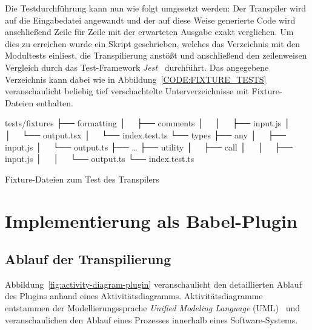 Die Testdurchführung kann nun wie folgt umgesetzt werden: Der Transpiler wird auf die Eingabedatei angewandt und der auf diese Weise generierte Code wird anschließend Zeile für Zeile mit der erwarteten Ausgabe exakt verglichen. Um dies zu erreichen wurde ein Skript geschrieben, welches das Verzeichnis mit den Modultests einliest, die Transpilierung anstößt und anschließend den zeilenweisen Vergleich durch das Test-Framework \textit{Jest}~\autocite{SOFTWARE:JEST} durchführt. Das angegebene Verzeichnis kann dabei wie in Abbildung~\ref{CODE:FIXTURE_TESTS} veranschaulicht beliebig tief verschachtelte Unterverzeichnisse mit Fixture-Dateien enthalten.

\bigskip
\begin{listing}[htbp]
  \begin{textcode}
  tests/fixtures
  ├── formatting
  │   ├── comments
  │   │   ├── input.js
  │   │   └── output.tsx
  │   └── index.test.ts
  └── types
      ├── any
      │   ├── input.js
      │   └── output.ts
      ├── …
      ├── utility
      │   ├── call
      │   │   ├── input.js
      │   │   └── output.ts
      └── index.test.ts
  \end{textcode}
  \caption{Fixture-Dateien zum Test des Transpilers}
  \captionsetup{justification=raggedright,singlelinecheck=false}
  \label{CODE:FIXTURE_TESTS}
\end{listing}

\section{Implementierung als Babel-Plugin}

\subsection{Ablauf der Transpilierung}


Abbildung~\ref{fig:activity-diagram-plugin} veranschaulicht den detaillierten Ablauf des Plugins anhand eines Aktivitätsdiagramms. Aktivitätsdiagramme entstammen der Modellierungssprache \textit{Unified Modeling Language} (UML)~\autocite{OMG:UML} und veranschaulichen den Ablauf eines Prozesses innerhalb eines Software-Systems.


